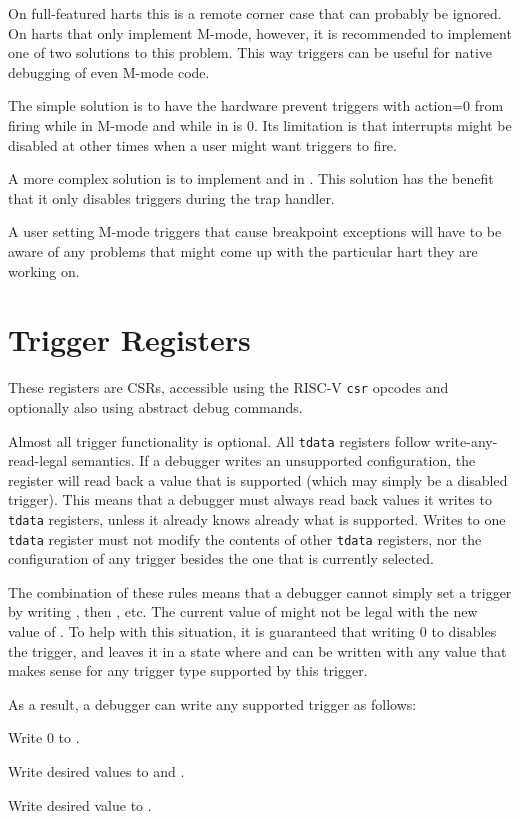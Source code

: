 On full-featured harts this is a remote corner case that can probably be
ignored. On harts that only implement M-mode, however, it is recommended to
implement one of two solutions to this problem. This way triggers can be useful
for native debugging of even M-mode code.

The simple solution is to have the hardware prevent triggers with action=0 from
firing while in M-mode and while \FcsrMcontrolMie in \Rmstatus is 0. Its limitation is
that interrupts might be disabled at other times when a user might want
triggers to fire.

A more complex solution is to implement \FcsrTcontrolMte and \FcsrTcontrolMpte in \RcsrTcontrol. This
solution has the benefit that it only disables triggers during the trap
handler.

A user setting M-mode triggers that cause breakpoint exceptions will have to be
aware of any problems that might come up with the particular hart they are
working on.

\section{Trigger Registers}

These registers are CSRs, accessible using the RISC-V {\tt csr} opcodes and
optionally also using abstract debug commands.

Almost all trigger functionality is optional. All {\tt tdata} registers follow
write-any-read-legal semantics. If a debugger writes an unsupported
configuration, the register will read back a value that is supported (which may
simply be a disabled trigger).  This means that a debugger must always read
back values it writes to {\tt tdata} registers, unless it already knows already
what is
supported.  Writes to one {\tt tdata} register must not modify the contents of
other {\tt tdata} registers, nor the configuration of any trigger besides the
one that is currently selected.

The combination of these rules means that a debugger cannot simply set a
trigger by writing \RcsrTdataOne, then \RcsrTdataTwo, etc. The current value
of \RcsrTdataTwo might not be legal with the new value of \RcsrTdataOne. To
help with this situation, it is guaranteed that writing 0 to \RcsrTdataOne
disables the trigger, and leaves it in a state where \RcsrTdataTwo and
\RcsrTdataThree can be written with any value that makes sense for any
trigger type supported by this trigger.

\begin{steps}{As a result, a debugger can write any supported trigger as
follows:}
\item Write 0 to \RcsrTdataOne.
\item Write desired values to \RcsrTdataTwo and \RcsrTdataThree.
\item Write desired value to \RcsrTdataOne.
\end{steps}


